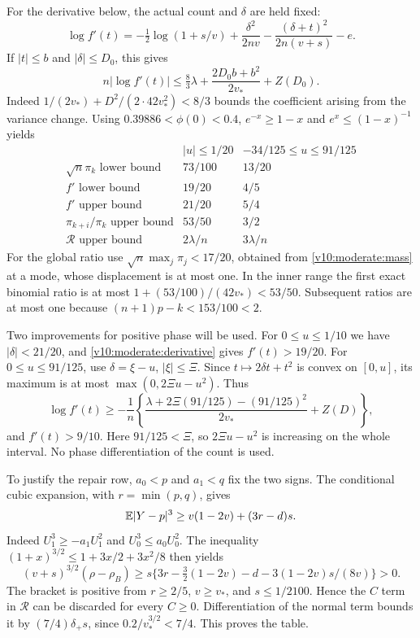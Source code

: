 For the derivative below, the actual count and $\delta$ are held fixed:
\[
 \log f'(t)=-\tfrac12\log(1+s/v)+\frac{\delta^2}{2nv}
                -\frac{(\delta+t)^2}{2n(v+s)}-e.
\]
If $|t|\le b$ and $|\delta|\le D_0$, this gives
\begin{equation}\label{v10:moderate:derivative}
 n|\log f'(t)|\le\tfrac83\lambda+
                 \frac{2D_0b+b^2}{2v_*}+Z(D_0).
\end{equation}
Indeed $1/(2v_*)+D^2/(2\cdot42v_*^2)<8/3$ bounds the coefficient
arising from the variance change. Using
$0.39886<\phi(0)<0.4$, $e^{-x}\ge1-x$ and
$e^x\le(1-x)^{-1}$ yields
\[
\begin{array}{c|cc}
 & |u|\le1/20&-34/125\le u\le91/125\\\hline
 \sqrt n\pi_k\text{ lower bound}&73/100&13/20\\
 f'\text{ lower bound}&19/20&4/5\\
 f'\text{ upper bound}&21/20&5/4\\
 \pi_{k+i}/\pi_k\text{ upper bound}&53/50&3/2\\
 \mathcal R\text{ upper bound}&2\lambda/n&3\lambda/n
\end{array}
\]
For the global ratio use $\sqrt n\max_j\pi_j<17/20$, obtained from
\eqref{v10:moderate:mass} at a mode, whose displacement is at most one.
In the inner range the first exact binomial ratio is at most
$1+(53/100)/(42v_*)<53/50$. Subsequent ratios are at most one because
$(n+1)p-k<153/100<2$.

Two improvements for positive phase will be used. For $0\le u\le1/10$
we have $|\delta|<21/20$, and \eqref{v10:moderate:derivative} gives
$f'(t)>19/20$. For $0\le u\le91/125$, use
$\delta=\xi-u$, $|\xi|\le\Xi$. Since $t\mapsto2\delta t+t^2$ is
convex on $[0,u]$, its maximum is at most
$\max(0,2\Xi u-u^2)$. Thus
\[
 \log f'(t)\ge-\frac1n
   \left\{\frac{\lambda+2\Xi(91/125)-(91/125)^2}{2v_*}+Z(D)\right\},
\]
and $f'(t)>9/10$. Here $91/125<\Xi$, so $2\Xi u-u^2$ is increasing
on the whole interval. No phase differentiation of the count is used.

To justify the repair row, $a_0<p$ and $a_1<q$ fix the two signs.
The conditional cubic expansion, with $r=\min(p,q)$, gives
\[
 \mathbb E|Y-p|^3\ge v(1-2v)+(3r-d)s.
\]
Indeed $U_1^3\ge-a_1U_1^2$ and $U_0^3\le a_0U_0^2$.
The inequality $(1+x)^{3/2}\le1+3x/2+3x^2/8$ then yields
\[
 (v+s)^{3/2}(\rho-\rho_B)
 \ge s\{3r-\tfrac32(1-2v)-d-3(1-2v)s/(8v)\}>0.
\]
The bracket is positive from $r\ge2/5$, $v\ge v_*$, and
$s\le1/2100$. Hence the $C$ term in $\mathcal R$ can be discarded
for every $C\ge0$. Differentiation of the normal term bounds it by
$(7/4)\delta_+s$, since $0.2/v_*^{3/2}<7/4$. This proves the table.

